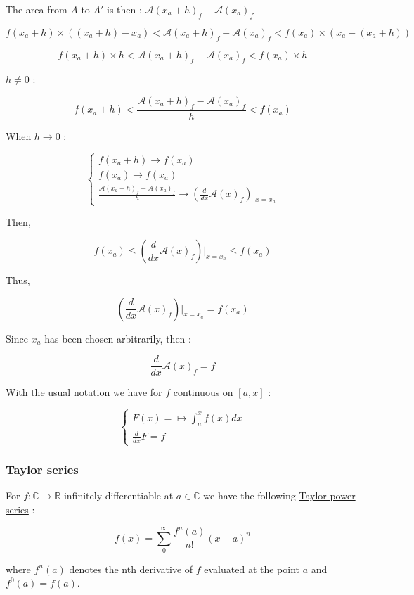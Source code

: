 \documentclass[12pt]{article}
\begin{document}
The area from $A$ to $A'$ is then : $\mathcal{A}(x_a+h)_f - \mathcal{A}(x_a)_f$

$$ 
f(x_a +h) \times ( (x_a+h)-x_a) < \mathcal{A}(x_a+h)_f - \mathcal{A}(x_a)_f < f(x_a) \times ( x_a-(x_a+h))
$$

$$ 
f(x_a +h) \times h < \mathcal{A}(x_a+h)_f - \mathcal{A}(x_a)_f < f(x_a) \times h
$$

$h \neq 0$ :

$$ 
f(x_a +h) < \frac{\mathcal{A}(x_a+h)_f - \mathcal{A}(x_a)_f}{h} < f(x_a)
$$

When $h \rightarrow 0$ :

$$
\begin{cases}
f(x_a +h) \rightarrow f(x_a) \\
f(x_a) \rightarrow f(x_a) \\
\frac{\mathcal{A}(x_a+h)_f - \mathcal{A}(x_a)_f}{h} \rightarrow (\frac{d}{dx} \mathcal{A}(x)_f)|_{x=x_a}
\end{cases}
$$

Then,

$$ 
f(x_a) \leq (\frac{d}{dx} \mathcal{A}(x)_f)|_{x=x_a} \leq f(x_a)
$$

Thus,

$$
(\frac{d}{dx} \mathcal{A}(x)_f)|_{x=x_a} = f(x_a)
$$

Since $x_a$ has been chosen arbitrarily, then :

$$
\frac{d}{dx} \mathcal{A}(x)_f = f
$$

With the usual notation we have for $f$ continuous on $[a, x]$ :

$$
\begin{cases}
F(x) = \mapsto \int_a^x f(x)dx \\
\frac{d}{dx}F = f
\end{cases}
$$

\subsubsection{Taylor series}

For $f: \mathbb{C} \rightarrow \mathbb{R}$ infinitely differentiable at $a \in \mathbb{C}$ we have the following \href{https://en.wikipedia.org/wiki/Taylor_series}{Taylor power series} :

$$
f(x) = \sum_0^\infty  \frac{f^n(a)}{n!} (x-a)^n 
$$

where $f^n(a)$ denotes the nth derivative of $f$ evaluated at the point $a$ and $f^0(a)=f(a)$.
\end{document}
